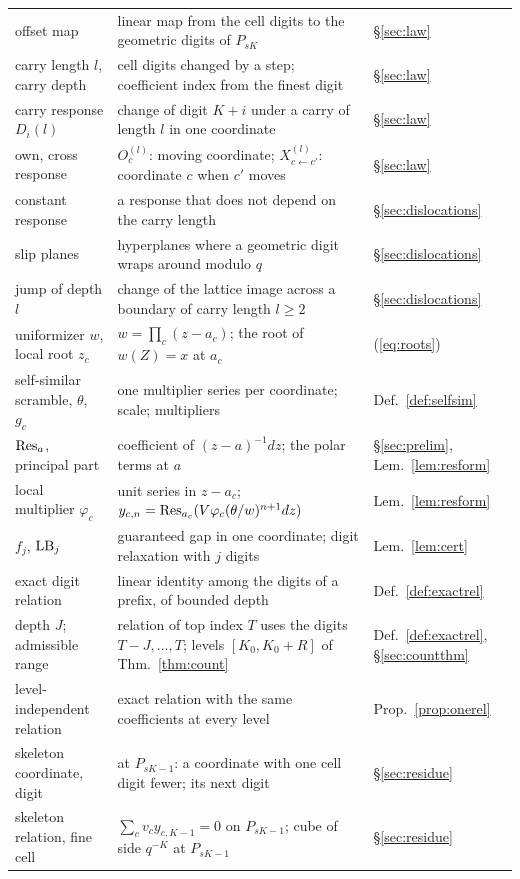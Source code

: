 \begin{table}[!tp]
\begin{tabular}{@{}>{\raggedright\arraybackslash}p{}>{\raggedright\arraybackslash}p{}l@{}}
offset map & linear map from the cell digits to the geometric digits of $P_{sK}$ & \S\ref{sec:law}\\
carry length $l$, carry depth & cell digits changed by a step; coefficient index from the finest digit & \S\ref{sec:law}\\
carry response $D_i(l)$ & change of digit $K+i$ under a carry of length $l$ in one coordinate & \S\ref{sec:law}\\
own, cross response & $O^{(l)}_c$: moving coordinate; $X^{(l)}_{c\leftarrow c'}$: coordinate $c$ when $c'$ moves & \S\ref{sec:law}\\
constant response & a response that does not depend on the carry length & \S\ref{sec:dislocations}\\
slip planes & hyperplanes where a geometric digit wraps around modulo $q$ & \S\ref{sec:dislocations}\\
jump of depth $l$ & change of the lattice image across a boundary of carry length $l\ge2$ & \S\ref{sec:dislocations}\\
uniformizer $w$, local root $z_c$ & $w=\prod_c(z-a_c)$; the root of $w(Z)=x$ at $a_c$ & (\ref{eq:roots})\\
self-similar scramble, $\theta$, $g_c$ & one multiplier series per coordinate; scale; multipliers & Def.~\ref{def:selfsim}\\
$\operatorname{Res}_a$, principal part & coefficient of $(z-a)^{-1}dz$; the polar terms at $a$ & \S\ref{sec:prelim}, Lem.~\ref{lem:resform}\\
local multiplier $\varphi_c$ & unit series in $z-a_c$; $y_{c,n}=\operatorname{Res}_{a_c}(V\varphi_c(\theta/w)^{n+1}dz)$ & Lem.~\ref{lem:resform}\\
$f_j$, $\mathrm{LB}_j$ & guaranteed gap in one coordinate; digit relaxation with $j$ digits & Lem.~\ref{lem:cert}\\
exact digit relation & linear identity among the digits of a prefix, of bounded depth & Def.~\ref{def:exactrel}\\
depth $J$; admissible range & relation of top index $T$ uses the digits $T-J,\dots,T$; levels $[K_0,K_0+R]$ of Thm.~\ref{thm:count} & Def.~\ref{def:exactrel}, \S\ref{sec:countthm}\\
level-independent relation & exact relation with the same coefficients at every level & Prop.~\ref{prop:onerel}\\
skeleton coordinate, digit & at $P_{sK-1}$: a coordinate with one cell digit fewer; its next digit & \S\ref{sec:residue}\\
skeleton relation, fine cell & $\sum_cv_cy_{c,K-1}=0$ on $P_{sK-1}$; cube of side $q^{-K}$ at $P_{sK-1}$ & \S\ref{sec:residue}\\

\end{tabular}
\end{table}
